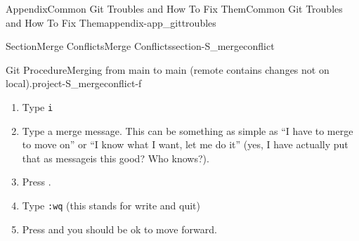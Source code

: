 \documentclass[oneside,10pt,]{book}
\newcommand{\mono}[1]{\texttt{#1}}
\newcommand{\kbd}[1]{\keys{{#1}}}
\begin{document}
\begin{appendixptx}{Appendix}{Common Git Troubles and How To Fix Them}{}{Common Git Troubles and How To Fix Them}{}{}{appendix-app_gittroubles}
\begin{sectionptx}{Section}{Merge Conflicts}{}{Merge Conflicts}{}{}{section-S_mergeconflict}
\begin{project}{Git Procedure}{Merging from main to main (remote contains changes not on local).}{project-S_mergeconflict-f}
\begin{enumerate}[font=\bfseries,label=(\alph*),ref=\alph*]
\item{}Type \mono{i}%
\item{}Type a merge message. This can be something as simple as ``I have to merge to move on'' or ``I know what I want, let me do it'' (yes, I have actually put that as message\textellipsis{}is this good? Who knows?).%
\item{}Press \kbd{esc}.%
\item{}Type \mono{:wq} (this stands for write and quit)%
\item{}Press \kbd{Enter} and you should be ok to move forward.%
\end{enumerate}%
\end{project}%
\end{sectionptx}
\end{appendixptx}
%
%
\typeout{************************************************}
\typeout{************************************************}
%
\end{document}
